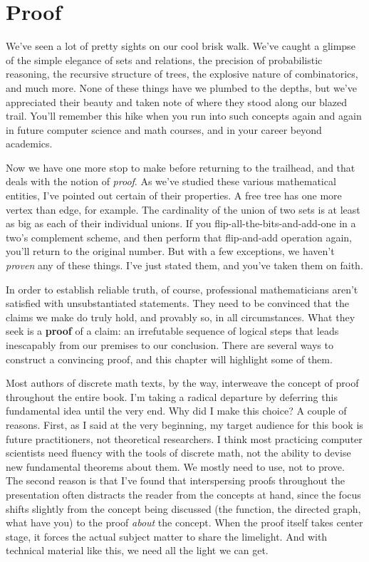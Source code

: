 
\chapter{Proof}

We've seen a lot of pretty sights on our cool brisk walk. We've caught a
glimpse of the simple elegance of sets and relations, the precision of
probabilistic reasoning, the recursive structure of trees, the explosive
nature of combinatorics, and much more. None of these things have we
plumbed to the depths, but we've appreciated their beauty and taken note of
where they stood along our blazed trail. You'll remember this hike when you
run into such concepts again and again in future computer science and
math courses, and in your career beyond academics.

Now we have one more stop to make before returning to the trailhead, and
that deals with the notion of \textit{proof}. As we've studied these
various mathematical entities, I've pointed out certain of their
properties. A free tree has one more vertex than edge, for example. The
cardinality of the union of two sets is at least as big as each of their
individual unions. If you flip-all-the-bits-and-add-one in a two's
complement scheme, and then perform that flip-and-add operation again,
you'll return to the original number. But with a few exceptions, we haven't
\textit{proven} any of these things. I've just stated them, and you've
taken them on faith.

In order to establish reliable truth, of course, professional
mathematicians aren't satisfied with unsubstantiated statements. They need
to be convinced that the claims we make do truly hold, and provably so, in
all circumstances. What they seek is a \textbf{proof} of a claim: an
irrefutable sequence of logical steps that leads inescapably from our
premises to our conclusion. There are several ways to construct a
convincing proof, and this chapter will highlight some of them.

Most authors of discrete math texts, by the way, interweave the concept of
proof throughout the entire book. I'm taking a radical departure by
deferring this fundamental idea until the very end. Why did I make this
choice? A couple of reasons. First, as I said at the very beginning, my
target audience for this book is future practitioners, not theoretical
researchers. I think most practicing computer scientists need fluency with
the tools of discrete math, not the ability to devise new fundamental
theorems about them. We mostly need to use, not to prove. The second reason
is that I've found that interspersing proofs throughout the presentation
often distracts the reader from the concepts at hand, since the focus
shifts slightly from the concept being discussed (the function, the
directed graph, what have you) to the proof \textit{about} the concept.
When the proof itself takes center stage, it forces the actual subject
matter to share the limelight. And with technical material like this, we
need all the light we can get.

